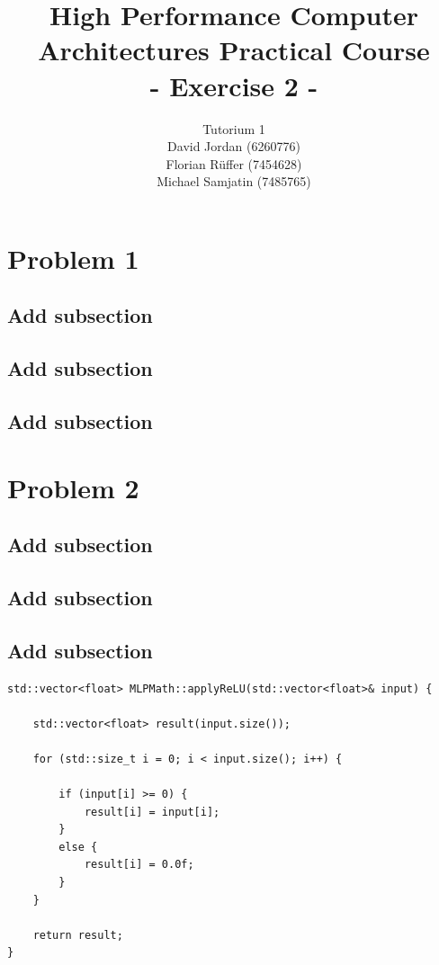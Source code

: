 \documentclass{article}
\title{\textbf{High Performance Computer Architectures Practical Course \\ - Exercise 2 -} \\[10mm]}
\author{Tutorium 1 \\[10mm] David Jordan (6260776) \\[1mm] Florian Rüffer (7454628) \\[1mm] Michael Samjatin (7485765) \\[10mm]}
\begin{document}
\maketitle
\newpage
\section*{Problem 1}
\subsection*{Add subsection}
\subsection*{Add subsection}
\subsection*{Add subsection}
\section*{Problem 2}
\subsection{Add subsection}
\subsection{Add subsection}
\subsection{Add subsection}
\renewcommand{\lstlistingname}{File}%
\renewcommand{\lstlistlistingname}{List of \lstlistingname s}%

\begin{lstlisting}[caption=Add caption]
std::vector<float> MLPMath::applyReLU(std::vector<float>& input) {

    std::vector<float> result(input.size());

    for (std::size_t i = 0; i < input.size(); i++) {

        if (input[i] >= 0) {  
            result[i] = input[i];
        }
        else {
            result[i] = 0.0f;
        }
    }

    return result;
}
\end{lstlisting}
\end{document}
